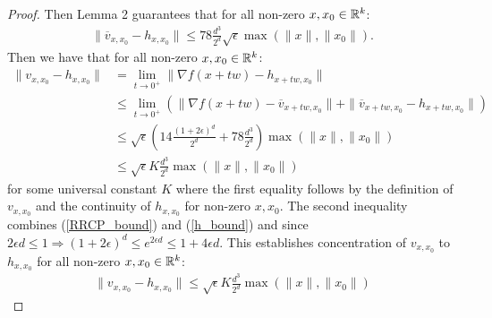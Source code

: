 \documentclass{article}
\begin{document}
\begin{proof}
Then Lemma 2 guarantees that for all non-zero $x,x_0 \in \mathbb{R}^k$: \begin{align}
\|\overline{v}_{x,x_0} - h_{x,x_0} \| \leq 78\frac{d^3}{2^d} \sqrt{\epsilon} \max(\|x\|,\|x_0\|). \label{h_bound}
\end{align} Then we have that for all non-zero $x,x_0 \in \mathbb{R}^k$: \begin{align*}
\|v_{x,x_0} - h_{x,x_0}\| & = \lim_{t \rightarrow 0^+} \|\nabla f(x + tw) - h_{x + t w,x_0}\| \\
& \leq \lim_{t \rightarrow 0^+} \left(\|\nabla f(x + tw) - \overline{v}_{x+tw,x_0}\| + \|\overline{v}_{x+tw,x_0} - h_{x + t w,x_0}\|\right) \\
& \leq \sqrt{\epsilon}\left(14 \frac{(1 + 2\epsilon)^d}{2^d} + 78\frac{d^3}{2^d}\right)\max(\|x\|,\|x_0\|) \\
& \leq \sqrt{\epsilon}K \frac{d^3}{2^d}\max(\|x\|,\|x_0\|)
\end{align*} for some universal constant $K$ where the first equality follows by the definition of $v_{x,x_0}$ and the continuity of $h_{x,x_0}$ for non-zero $x,x_0$. The second inequality combines (\ref{RRCP_bound}) and (\ref{h_bound}) and since $2\epsilon d \leq 1 \Longrightarrow (1 + 2\epsilon)^d \leq e^{2\epsilon d} \leq 1 + 4\epsilon d.$ This establishes concentration of $v_{x,x_0}$ to $h_{x,x_0}$ for all non-zero $x,x_0 \in \mathbb{R}^k$: \begin{align}
\|v_{x,x_0} - h_{x,x_0}\| \leq \sqrt{\epsilon}K \frac{d^3}{2^d}\max(\|x\|,\|x_0\|) \label{conc_v_h}
\end{align}


\end{proof}
\end{document}
